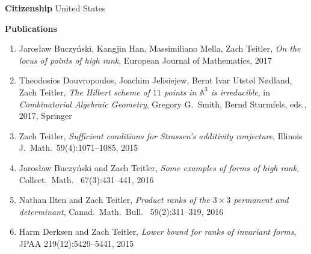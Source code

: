\documentclass[12pt]{article}
\begin{document}

\textbf{Citizenship}
\quad United States
\bigskip






\textbf{Publications}
\begin{enumerate}[1.]

\item Jaros{\l}aw Buczy\'nski, Kangjin Han, Massimiliano Mella, Zach Teitler,
\emph{On the locus of points of high rank},
European Journal of Mathematics, 2017

\item Theodosios Douvropoulos, Joachim Jelisiejew, Bernt Ivar Utst{\o}l N{\o}dland, Zach Teitler,
\emph{The Hilbert scheme of $11$ points in $\mathbb{A}^3$ is irreducible},
in \emph{Combinatorial Algebraic Geometry}, Gregory G.\ Smith, Bernd Sturmfels, eds., 2017, Springer

\item Zach Teitler,
\emph{Sufficient conditions for Strassen's additivity conjecture},
Illinois J.\ Math.\
59(4):1071--1085, 2015

\item Jaros{\l}aw Buczy\'nski and Zach Teitler,
\emph{Some examples of forms of high rank},
Collect.\ Math.\
67(3):431--441, 2016

\item Nathan Ilten and Zach Teitler,
\emph{Product ranks of the $3 \times 3$ permanent and determinant},
Canad.\ Math.\ Bull.\
59(2):311--319, 2016

\item Harm Derksen and Zach Teitler,
\emph{Lower bound for ranks of invariant forms},
JPAA
219(12):5429--5441, 2015


\end{enumerate}
\end{document}
